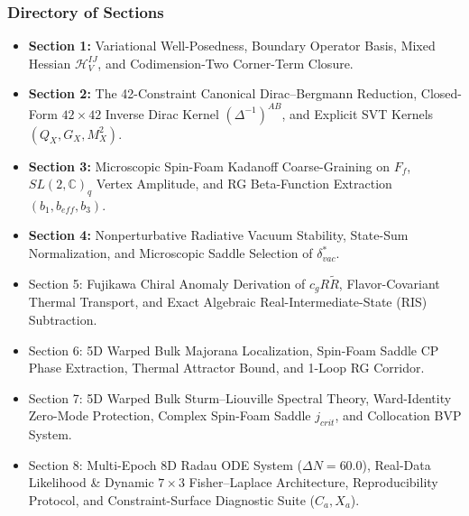 \documentclass[aps,prd,onecolumn,superscriptaddress,nofootinbib,longbibliography,10pt]{revtex4-2}
\begin{document}
  
\subsubsection*{Directory of Sections}

  
\begin{itemize}
    
\item \textbf{Section 1:} Variational Well-Posedness, Boundary Operator Basis, Mixed Hessian \(\mathcal{H}_V^{IJ}\), and Codimension-Two Corner-Term Closure.
    
\item \textbf{Section 2:} The 42-Constraint Canonical Dirac–Bergmann Reduction, Closed-Form \(42\times 42\) Inverse Dirac Kernel \((\Delta^{-1})^{AB}\), and Explicit SVT Kernels \((Q_X, G_X, M_X^2)\).
    
\item \textbf{Section 3:} Microscopic Spin-Foam Kadanoff Coarse-Graining on \(F_f\), \(SL(2,\mathbb{C})_q\) Vertex Amplitude, and RG Beta-Function Extraction \((b_1, b_{eff}, b_3)\).
    
\item \textbf{Section 4:} Nonperturbative Radiative Vacuum Stability, State-Sum Normalization, and Microscopic Saddle Selection of \(\delta_{vac}^*\).
    
\item Section 5: Fujikawa Chiral Anomaly Derivation of \(c_g R\tilde{R}\), Flavor-Covariant Thermal Transport, and Exact Algebraic Real-Intermediate-State (RIS) Subtraction.

\item Section 6: 5D Warped Bulk Majorana Localization, Spin-Foam Saddle CP Phase Extraction, Thermal Attractor Bound, and 1-Loop RG Corridor.

\item Section 7: 5D Warped Bulk Sturm--Liouville Spectral Theory, Ward-Identity Zero-Mode Protection, Complex Spin-Foam Saddle \(j_{crit}\), and Collocation BVP System.

\item Section 8: Multi-Epoch 8D Radau ODE System (\(\Delta N = 60.0\)), Real-Data Likelihood \& Dynamic \(7\times 3\) Fisher–Laplace Architecture, Reproducibility Protocol, and Constraint-Surface Diagnostic Suite (\(C_a, X_a\)).
  
\end{itemize}



 
\end{document}
